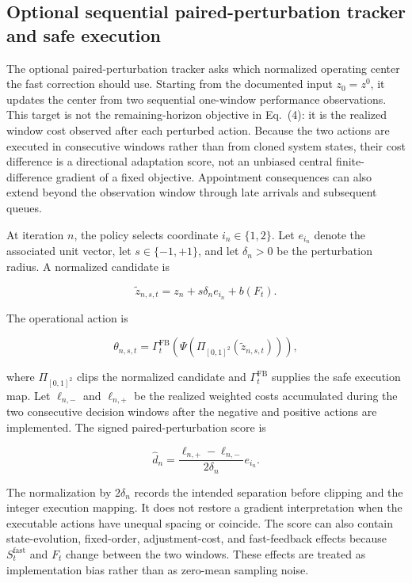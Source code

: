 \documentclass[preprint,12pt,authoryear,a4paper]{elsarticle}
\begin{document}
\subsection{Optional sequential paired-perturbation tracker and safe execution}
\label{subsec:4-3-paired-perturbation-adaptation-and-safe-execution}

The optional paired-perturbation tracker asks which normalized operating center the fast correction should use. Starting from the documented input \(z_0=z^0\), it updates the center from two sequential one-window performance observations. This target is not the remaining-horizon objective in Eq.~(4): it is the realized window cost observed after each perturbed action. Because the two actions are executed in consecutive windows rather than from cloned system states, their cost difference is a directional adaptation score, not an unbiased central finite-difference gradient of a fixed objective. Appointment consequences can also extend beyond the observation window through late arrivals and subsequent queues.

At iteration \(n\), the policy selects coordinate \(i_n\in\{1,2\}\). Let \(e_{i_n}\) denote the associated unit vector, let \(s\in\{-1,+1\}\), and let \(\delta_n>0\) be the perturbation radius. A normalized candidate is

\[
\widetilde z_{n,s,t}
=z_n+s\delta_ne_{i_n}+b(F_t).
\tag{17}
\]

The operational action is

\[
\theta_{n,s,t}
=\Gamma_t^{\mathrm{FB}}
\left(\Psi\left(\Pi_{[0,1]^2}(\widetilde z_{n,s,t})\right)\right),
\tag{18}
\]

where \(\Pi_{[0,1]^2}\) clips the normalized candidate and \(\Gamma_t^{\mathrm{FB}}\) supplies the safe execution map. Let \(\ell_{n,-}\) and \(\ell_{n,+}\) be the realized weighted costs accumulated during the two consecutive decision windows after the negative and positive actions are implemented. The signed paired-perturbation score is

\[
\widehat d_n
=\frac{\ell_{n,+}-\ell_{n,-}}{2\delta_n}e_{i_n}.
\tag{19}
\]

The normalization by \(2\delta_n\) records the intended separation before clipping and the integer execution mapping. It does not restore a gradient interpretation when the executable actions have unequal spacing or coincide. The score can also contain state-evolution, fixed-order, adjustment-cost, and fast-feedback effects because \(S_t^{\mathrm{fast}}\) and \(F_t\) change between the two windows. These effects are treated as implementation bias rather than as zero-mean sampling noise.
\end{document}

